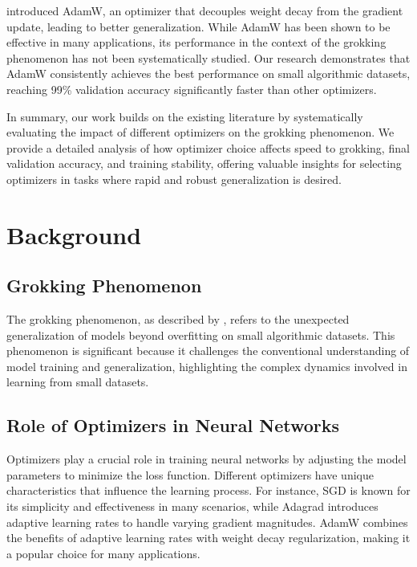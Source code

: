 \documentclass{article} %
\begin{document}
\citet{loshchilov2017adamw} introduced AdamW, an optimizer that decouples weight decay from the gradient update, leading to better generalization. While AdamW has been shown to be effective in many applications, its performance in the context of the grokking phenomenon has not been systematically studied. Our research demonstrates that AdamW consistently achieves the best performance on small algorithmic datasets, reaching 99\% validation accuracy significantly faster than other optimizers.

In summary, our work builds on the existing literature by systematically evaluating the impact of different optimizers on the grokking phenomenon. We provide a detailed analysis of how optimizer choice affects speed to grokking, final validation accuracy, and training stability, offering valuable insights for selecting optimizers in tasks where rapid and robust generalization is desired.

\section{Background}
\label{sec:background}

\subsection{Grokking Phenomenon}
The grokking phenomenon, as described by \citet{power2022grokking}, refers to the unexpected generalization of models beyond overfitting on small algorithmic datasets. This phenomenon is significant because it challenges the conventional understanding of model training and generalization, highlighting the complex dynamics involved in learning from small datasets.

\subsection{Role of Optimizers in Neural Networks}
Optimizers play a crucial role in training neural networks by adjusting the model parameters to minimize the loss function. Different optimizers have unique characteristics that influence the learning process. For instance, SGD \cite{goodfellow2016deep} is known for its simplicity and effectiveness in many scenarios, while Adagrad introduces adaptive learning rates to handle varying gradient magnitudes. AdamW \cite{loshchilov2017adamw} combines the benefits of adaptive learning rates with weight decay regularization, making it a popular choice for many applications.
\end{document}
